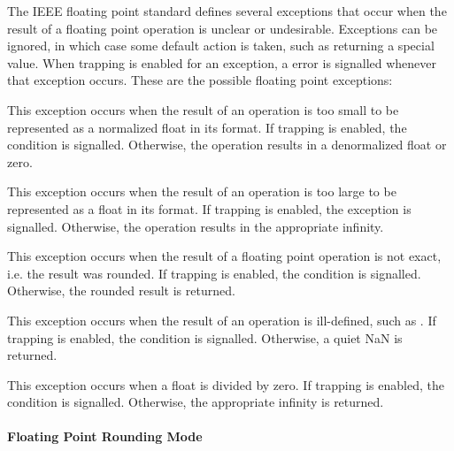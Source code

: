 The IEEE floating point standard defines several exceptions that occur
when the result of a floating point operation is unclear or
undesirable.  Exceptions can be ignored, in which case some default
action is taken, such as returning a special value.  When trapping is
enabled for an exception, a error is signalled whenever that exception
occurs.  These are the possible floating point exceptions:
\begin{Lentry}
  
\item[\kwd{underflow}] This exception occurs when the result of an
  operation is too small to be represented as a normalized float in
  its format.  If trapping is enabled, the
   condition is signalled.
  Otherwise, the operation results in a denormalized float or zero.
  
\item[\kwd{overflow}] This exception occurs when the result of an
  operation is too large to be represented as a float in its format.
  If trapping is enabled, the 
  exception is signalled.  Otherwise, the operation results in the
  appropriate infinity.
  
\item[\kwd{inexact}] This exception occurs when the result of a
  floating point operation is not exact, i.e. the result was rounded.
  If trapping is enabled, the 
  condition is signalled.  Otherwise, the rounded result is returned.
  
\item[\kwd{invalid}] This exception occurs when the result of an
  operation is ill-defined, such as .  If
  trapping is enabled, the 
  condition is signalled.  Otherwise, a quiet NaN is returned.
  
\item[\kwd{divide-by-zero}] This exception occurs when a float is
  divided by zero.  If trapping is enabled, the
   condition is signalled.  Otherwise, the
  appropriate infinity is returned.
\end{Lentry}

\paragraph{Floating Point Rounding Mode}
\label{float-rounding-modes}

